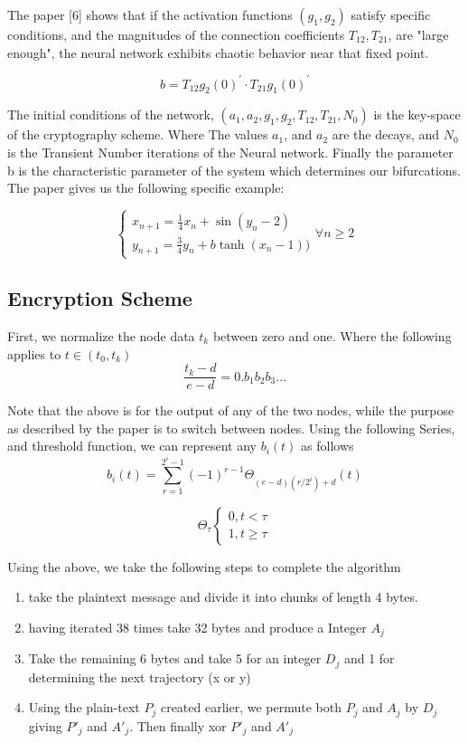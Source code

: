 \documentclass[12pt, letterpaper]{article}
\begin{document}
The paper [6] shows that if the activation functions \((g_{1}, g_{2})\) satisfy specific conditions, and the magnitudes of the connection coefficients \(T_{12}, T_{21}\), are "large enough", the neural network exhibits chaotic behavior near that fixed point.

\begin{equation}\label{b defintion}
b = T_{12}g_{2}(0)^{'} \cdot T_{21}g_{1}(0)^{'}
\end{equation}

The initial conditions of the network, \((a_1, a_2, g_1, g_2, T_{12}, T_{21}, N_{0})\) is the key-space of the cryptography scheme. Where The values \(a_1\), and \(a_2\) are the decays, and \(N_{0}\) is the Transient Number iterations of the Neural network. Finally the parameter b is the characteristic parameter of the system which determines our bifurcations. The paper gives us the following specific example:

\begin{equation}\label{hopfield network}
    \begin{cases}
    x_{n+1} = \frac{1}{4}x_{n} + \sin(y_{n} - 2)\\
    y_{n+1} = \frac{3}{4}y_{n} + b\tanh(x_{n} - 1))
    \end{cases} \forall n \geq 2
\end{equation}

\subsection*{Encryption Scheme}
First, we normalize the node data \(t_{k}\) between zero and one. Where the following applies to \(t \in (t_{0}, t_{k})\)
\[\frac{t_{k} - d}{e -d} = 0.b_{1}b_{2}b_{3}\dots\]

Note that the above is for the output of any of the two nodes, while the purpose as described by the paper is to switch between nodes.  
Using the following Series, and threshold function, we can represent any \(b_{i}(t)\) as follows
\[b_{i}(t) = \sum_{r=1}^{2^{i} - 1}(-1)^{r-1}\Theta_{(e - d)(r/2^{i}) + d}(t)\]

\[\Theta_\tau
\begin{cases}
0, t < \tau \\
1, t \geq \tau
\end{cases}
\]

Using the above, we take the following steps to complete the algorithm
\begin{enumerate}
    \item take the plaintext message and divide it into chunks of length 4 bytes. 
    \item having iterated 38 times take 32 bytes and produce a Integer \(A_{j}\)
    \item Take the remaining 6 bytes and take 5 for an integer \(D_j\) and 1 for determining the next trajectory (x or y)
    \item Using the plain-text \(P_j\) created earlier, we permute both \(P_j\) and \(A_j\) by \(D_j\) giving \(P'_{j}\) and \(A'_{j}\). Then finally xor \(P'_j\) and \(A'_j\)
\end{enumerate}
\end{document}
